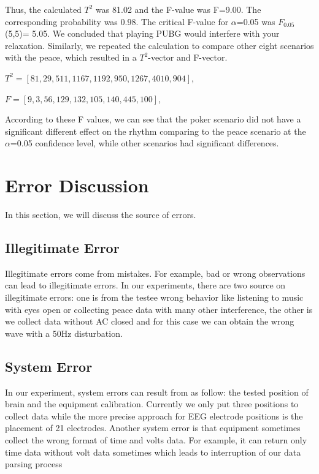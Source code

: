 \documentclass[letterpaper,twocolumn,10pt]{article}
\begin{document}
Thus, the calculated $T^2$ was 81.02 and the F-value was F=9.00. The corresponding probability was 0.98. The critical F-value for $\alpha$=0.05 was $F_0.05$(5,5)= 5.05. We concluded that playing PUBG would interfere with your relaxation. Similarly, we repeated the calculation to compare other eight scenarios with the peace, which resulted in a $T^2$-vector and F-vector.

$T^2=[81, 29, 511, 1167, 1192, 950, 1267, 4010, 904]$,

$F = [9, 3, 56, 129, 132, 105, 140, 445, 100]$,

According to these F values, we can see that the poker scenario did not have a significant different effect on the rhythm comparing to the peace scenario at the $\alpha$=0.05 confidence level, while other scenarios had significant differences. 

\section{Error Discussion}
In this section, we will discuss the source of errors.

\subsection{Illegitimate Error}

Illegitimate errors come from mistakes. For example, bad or wrong observations can lead to illegitimate errors. In our experiments, there are two source on illegitimate errors: one is from the testee wrong behavior like listening to music with eyes open or collecting peace data with many other interference, the other is we collect data without AC closed and for this case we can obtain the wrong wave with a 50Hz disturbation.

\subsection{System Error}

In our experiment, system errors can result from as follow: the tested position of brain and the equipment calibration. Currently we only put three positions to collect data while the more precise approach for EEG electrode positions is the placement of 21 electrodes. Another system error is that equipment sometimes collect the wrong format of time and volts data. For example, it can return only time data without volt data sometimes which leads to interruption of our data parsing process 
\end{document}
